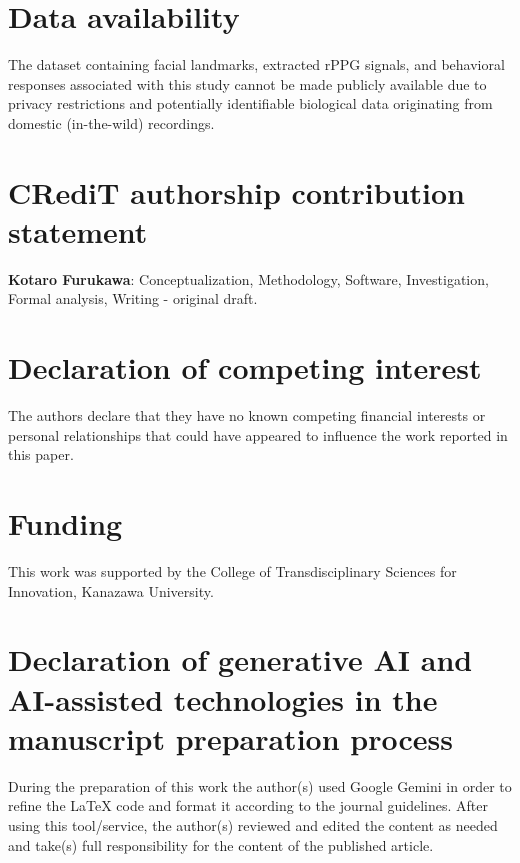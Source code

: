 \documentclass[dvipdfmx]{ehis}
\begin{document}
\section*{Data availability}
The dataset containing facial landmarks, extracted rPPG signals, and behavioral responses associated with this study cannot be made publicly available due to privacy restrictions and potentially identifiable biological data originating from domestic (in-the-wild) recordings.

\section*{CRediT authorship contribution statement}
\textbf{Kotaro Furukawa}: Conceptualization, Methodology, Software, Investigation, Formal analysis, Writing - original draft.

\section*{Declaration of competing interest}
The authors declare that they have no known competing financial interests or personal relationships that could have appeared to influence the work reported in this paper.

\section*{Funding}
This work was supported by the College of Transdisciplinary Sciences for Innovation, Kanazawa University.

\section*{Declaration of generative AI and AI-assisted technologies in the manuscript preparation process}
During the preparation of this work the author(s) used Google Gemini in order to refine the LaTeX code and format it according to the journal guidelines. After using this tool/service, the author(s) reviewed and edited the content as needed and take(s) full responsibility for the content of the published article.
\end{document}
